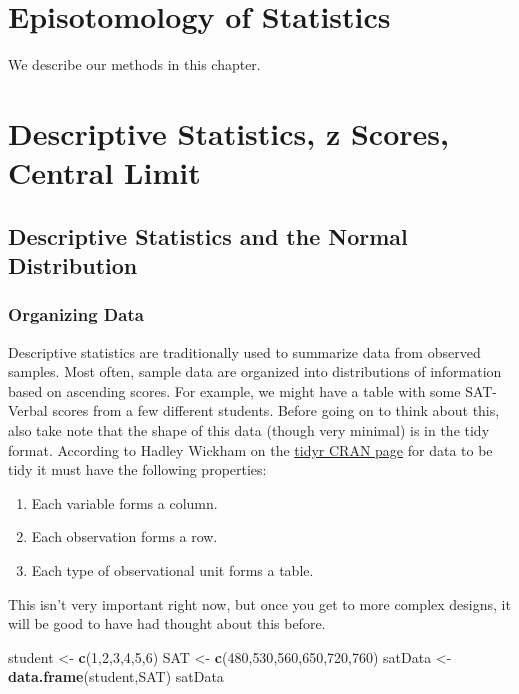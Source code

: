 \documentclass[]{book}
\newenvironment{Shaded}{\begin{snugshade}}{\end{snugshade}}
\newcommand{\KeywordTok}[1]{\textcolor[rgb]{0.13,0.29,0.53}{\textbf{#1}}}
\newcommand{\DecValTok}[1]{\textcolor[rgb]{0.00,0.00,0.81}{#1}}
\newcommand{\StringTok}[1]{\textcolor[rgb]{0.31,0.60,0.02}{#1}}
\newcommand{\NormalTok}[1]{#1}
\providecommand{\tightlist}{%
  \setlength{\itemsep}{0pt}\setlength{\parskip}{0pt}}
\theoremstyle{definition}
\theoremstyle{definition}
\theoremstyle{definition}
\theoremstyle{remark}
\begin{document}
\chapter{Episotomology of Statistics}\label{episotomology-of-statistics}

We describe our methods in this chapter.

\chapter{Descriptive Statistics, z Scores, Central
Limit}\label{descriptive-statistics-z-scores-central-limit}

\section{Descriptive Statistics and the Normal
Distribution}\label{descriptive-statistics-and-the-normal-distribution}

\subsection{Organizing Data}\label{organizing-data}

Descriptive statistics are traditionally used to summarize data from
observed samples. Most often, sample data are organized into
distributions of information based on ascending scores. For example, we
might have a table with some SAT-Verbal scores from a few different
students. Before going on to think about this, also take note that the
shape of this data (though very minimal) is in the tidy format.
According to Hadley Wickham on the
\href{https://cran.r-project.org/web/packages/tidyr/vignettes/tidy-data.html}{tidyr
CRAN page} for data to be tidy it must have the following properties:

\begin{enumerate}
\def\labelenumi{\arabic{enumi}.}
\tightlist
\item
  Each variable forms a column.
\item
  Each observation forms a row.
\item
  Each type of observational unit forms a table.
\end{enumerate}

This isn't very important right now, but once you get to more complex
designs, it will be good to have had thought about this before.

\begin{Shaded}
\begin{Highlighting}[]
\NormalTok{student <-}\StringTok{ }\KeywordTok{c}\NormalTok{(}\DecValTok{1}\NormalTok{,}\DecValTok{2}\NormalTok{,}\DecValTok{3}\NormalTok{,}\DecValTok{4}\NormalTok{,}\DecValTok{5}\NormalTok{,}\DecValTok{6}\NormalTok{)}
\NormalTok{SAT <-}\StringTok{ }\KeywordTok{c}\NormalTok{(}\DecValTok{480}\NormalTok{,}\DecValTok{530}\NormalTok{,}\DecValTok{560}\NormalTok{,}\DecValTok{650}\NormalTok{,}\DecValTok{720}\NormalTok{,}\DecValTok{760}\NormalTok{)}
\NormalTok{satData <-}\StringTok{ }\KeywordTok{data.frame}\NormalTok{(student,SAT)}
\NormalTok{satData}
\end{Highlighting}
\end{Shaded}
\end{document}
